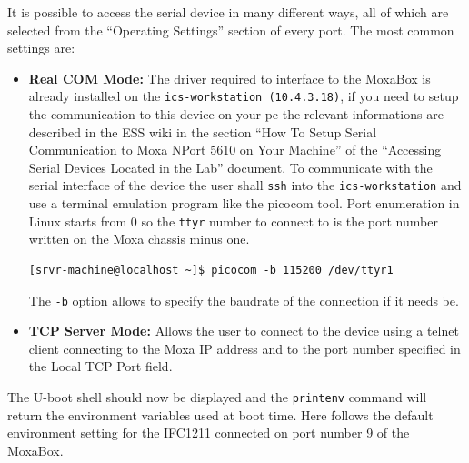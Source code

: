 \documentclass[11pt
  , a4paper
  , article
  , oneside
  , showtrims
]{memoir}
\begin{document}
It is possible to access the serial device in many different ways, all of which are selected from the ``Operating Settings'' section of every port. The most common settings are:
\begin{itemize}
\item \textbf{Real COM Mode:}
The driver required to interface to the MoxaBox is already installed on the \texttt{ics-workstation (10.4.3.18)}, if you need to setup the communication to this device on your pc the relevant informations are described in the ESS wiki in the section ``How To Setup Serial Communication to Moxa NPort 5610 on Your Machine'' of the ``Accessing Serial Devices Located in the Lab''\cite{ASDLL} document.
To communicate with the serial interface of the device the user shall \texttt{ssh} into the \texttt{ics-workstation} and use a terminal emulation program like the picocom tool. Port enumeration in Linux starts from 0 so the \texttt{ttyr} number to connect to is the port number written on the Moxa chassis minus one.
\begin{lstlisting}[style=termstyle]
[srvr-machine@localhost ~]$ picocom -b 115200 /dev/ttyr1
\end{lstlisting}
The \texttt{-b} option allows to specify the baudrate of the connection if it needs be.

\item \textbf{TCP Server Mode:}
Allows the user to connect to the device using a telnet client connecting to the Moxa IP address and to the port number specified in the Local TCP Port field.
\end{itemize}

The U-boot shell should now be displayed and the \texttt{printenv} command will return the environment variables used at boot time. Here follows the default environment setting for the IFC1211 connected on port number 9 of the MoxaBox.
\end{document}
